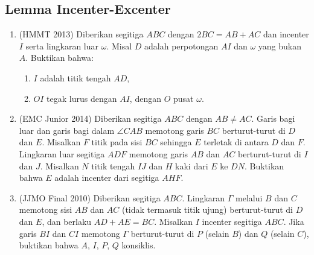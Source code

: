 \documentclass[12pt]{scrartcl}
\begin{document}
\subsection{Lemma Incenter-Excenter}
\begin{enumerate}[resume]

	\item (HMMT 2013)
	Diberikan segitiga $ABC$ dengan $2BC = AB + AC$ dan incenter $I$
	serta lingkaran luar $\omega$.
	Misal $D$ adalah perpotongan $AI$ dan $\omega$ yang bukan $A$.
	Buktikan bahwa:
	\begin{enumerate}
		\item $I$ adalah titik tengah $AD$,
		\item $OI$ tegak lurus dengan $AI$, dengan $O$ pusat $\omega$.
	\end{enumerate}

	\item (EMC Junior 2014)
	Diberikan segitiga $ABC$ dengan $AB \ne AC$.
	Garis bagi luar dan garis bagi dalam $\angle CAB$ memotong garis $BC$
	berturut-turut di $D$ dan $E$.
	Misalkan $F$ titik pada sisi $BC$ sehingga $E$ terletak di antara $D$
	dan $F$. Lingkaran luar segitiga $ADF$ memotong garis $AB$ dan $AC$
	berturut-turut di $I$ dan $J$.
	Misalkan $N$ titik tengah $IJ$ dan $H$ kaki dari $E$ ke $DN$.
	Buktikan bahwa $E$ adalah incenter dari segitiga $AHF$.

	\item (JJMO Final 2010)
	Diberikan segitiga $ABC$. Lingkaran $\Gamma$ melalui $B$ dan $C$
	memotong sisi $AB$ dan $AC$ (tidak termasuk titik ujung) berturut-turut
	di $D$ dan $E$, dan berlaku $AD + AE = BC$.
	Misalkan $I$ incenter segitiga $ABC$.
	Jika garis $BI$ dan $CI$ memotong $\Gamma$ berturut-turut di $P$
	(selain $B$) dan $Q$ (selain $C$),
	buktikan bahwa $A$, $I$, $P$, $Q$ konsiklis.

\end{enumerate}
\end{document}
